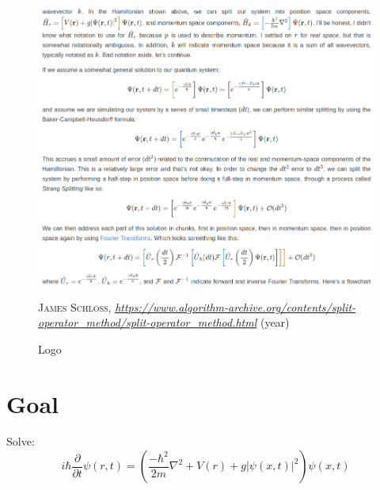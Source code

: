 \begin{figure}[H]
    \centering
    \includegraphics[width=1.0\textwidth]{IMAGE/strang_splitting.png}\\
    \caption{Logo}
    \textsc{James Schloss},
    \emph{            \url{https://www.algorithm-archive.org/contents/split-operator_method/split-operator_method.html}
    } (year)
    \label{fig:stability}
\end{figure}

\section{Goal}
Solve:
    \begin{equation}
        i \hbar \frac{\partial}{\partial t} \psi(r,t) = \left(\frac{-\hbar^{2}}{2 m} \nabla^{2} + V(r) + g |\psi(x,t)|^{2} \right) \psi(x,t)
    \end{equation}
